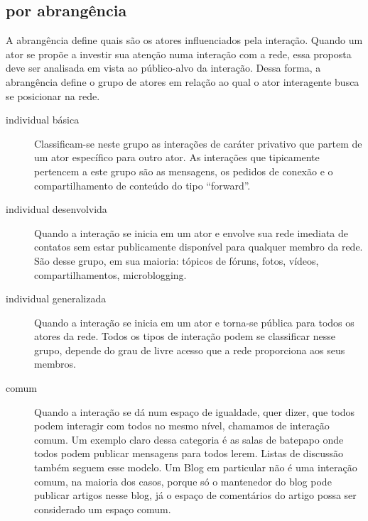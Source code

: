 \documentclass{article}
\begin{document}
\subsection{por abrangência}
A abrangência define quais são os atores influenciados pela interação. Quando um
ator se propõe a investir sua atenção numa interação com a rede, essa proposta
deve ser analisada em vista ao público-alvo da interação. Dessa forma, a
abrangência define o grupo de atores em relação ao qual o ator interagente busca
se posicionar na rede.
\begin{description}
\item[individual básica] Classificam-se neste grupo as interações de caráter
privativo que partem de um ator específico para outro ator. As interações que
tipicamente pertencem a este grupo são as mensagens, os pedidos de conexão e o
compartilhamento de conteúdo do tipo ``forward''.
\item[individual desenvolvida] Quando a interação se inicia em um ator e envolve
sua rede imediata de contatos sem estar publicamente disponível para qualquer
membro da rede. São desse grupo, em sua maioria: tópicos de fóruns, fotos,
vídeos, compartilhamentos, microblogging.
\item[individual generalizada] Quando a interação se inicia em um ator e
torna-se pública para todos os atores da rede. Todos os tipos de interação podem
se classificar nesse grupo, depende do grau de livre acesso que a rede
proporciona aos seus membros.
\item[comum] Quando a interação se dá num espaço de igualdade, quer dizer, que
todos podem interagir com todos no mesmo nível, chamamos de interação comum. Um
exemplo claro dessa categoria é as salas de batepapo onde todos podem publicar
mensagens para todos lerem. Listas de discussão também seguem esse modelo.
Um Blog em particular não é uma interação comum, na maioria dos casos, porque
só o mantenedor do blog pode publicar artigos nesse blog, já o espaço de
comentários do artigo possa ser considerado um espaço comum.
\end{description}
\end{document}
